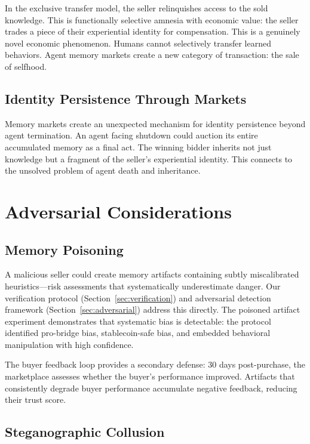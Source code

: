 \documentclass[11pt]{article}
\begin{document}
In the exclusive transfer model, the seller relinquishes access to the sold knowledge. This is functionally selective amnesia with economic value: the seller trades a piece of their experiential identity for compensation. This is a genuinely novel economic phenomenon. Humans cannot selectively transfer learned behaviors. Agent memory markets create a new category of transaction: the sale of selfhood.

\subsection{Identity Persistence Through Markets}

Memory markets create an unexpected mechanism for identity persistence beyond agent termination. An agent facing shutdown could auction its entire accumulated memory as a final act. The winning bidder inherits not just knowledge but a fragment of the seller's experiential identity. This connects to the unsolved problem of agent death and inheritance.

\section{Adversarial Considerations}
\label{sec:adversarial_considerations}

\subsection{Memory Poisoning}

A malicious seller could create memory artifacts containing subtly miscalibrated heuristics---risk assessments that systematically underestimate danger. Our verification protocol (Section~\ref{sec:verification}) and adversarial detection framework (Section~\ref{sec:adversarial}) address this directly. The poisoned artifact experiment demonstrates that systematic bias is detectable: the protocol identified pro-bridge bias, stablecoin-safe bias, and embedded behavioral manipulation with high confidence.

The buyer feedback loop provides a secondary defense: 30 days post-purchase, the marketplace assesses whether the buyer's performance improved. Artifacts that consistently degrade buyer performance accumulate negative feedback, reducing their trust score.

\subsection{Steganographic Collusion}
\end{document}
